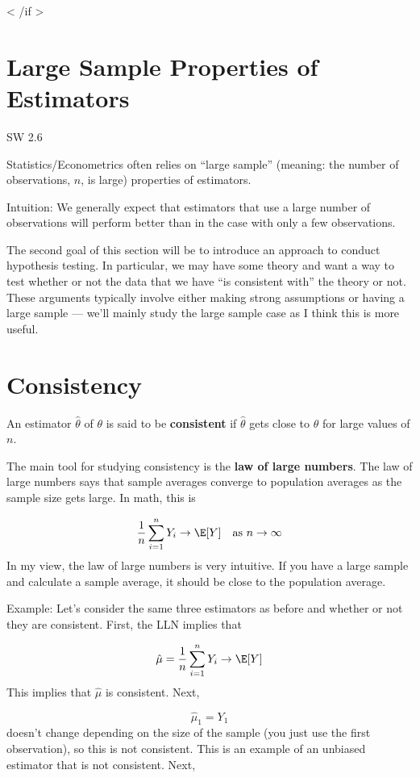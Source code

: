 \documentclass[
  letterpaper,
  DIV=11,
  numbers=noendperiod]{scrreprt}
\begin{document}
{{< /if  >}}

\section{Large Sample Properties of
Estimators}\label{large-sample-properties-of-estimators}

SW 2.6

Statistics/Econometrics often relies on ``large sample'' (meaning: the
number of observations, \(n\), is large) properties of estimators.

Intuition: We generally expect that estimators that use a large number
of observations will perform better than in the case with only a few
observations.

The second goal of this section will be to introduce an approach to
conduct hypothesis testing. In particular, we may have some theory and
want a way to test whether or not the data that we have ``is consistent
with'' the theory or not. These arguments typically involve either
making strong assumptions or having a large sample --- we'll mainly
study the large sample case as I think this is more useful.

\section{Consistency}\label{consistency}

An estimator \(\hat{\theta}\) of \(\theta\) is said to be
\textbf{consistent} if \(\hat{\theta}\) gets close to \(\theta\) for
large values of \(n\).

The main tool for studying consistency is the \textbf{law of large
numbers}. The law of large numbers says that sample averages converge to
population averages as the sample size gets large. In math, this is

\[
  \frac{1}{n} \sum_{i=1}^n Y_i \rightarrow \E[Y] \quad \textrm{as } n \rightarrow \infty
\] In my view, the law of large numbers is very intuitive. If you have a
large sample and calculate a sample average, it should be close to the
population average.

{Example: }Let's consider the same three estimators as before and
whether or not they are consistent. First, the LLN implies that

\[
  \hat{\mu} = \frac{1}{n} \sum_{i=1}^n Y_i \rightarrow \E[Y]
\] This implies that \(\hat{\mu}\) is consistent. Next,

\[
  \hat{\mu}_1 = Y_1
\] doesn't change depending on the size of the sample (you just use the
first observation), so this is not consistent. This is an example of an
unbiased estimator that is not consistent. Next,
\end{document}
